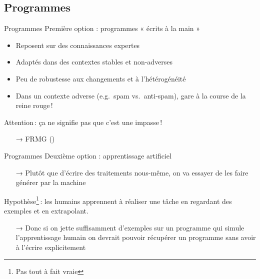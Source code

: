 \documentclass[xcolor={svgnames}, french]{beamer}
\begin{document}
\subsection{Programmes}
\begin{frame}{Programmes}
	Première option : programmes « écrits à la main »
	\begin{itemize}
		\item Reposent sur des \alert{connaissances expertes}
		\item Adaptés dans des contextes \alert{stables} et \alert{non-adverses}
		\item Peu de robustesse aux changements et à l'\alert{hétérogénéité}
		\item Dans un contexte adverse (e.g.\ spam vs.\ anti-spam), gare à la course de la reine rouge !
	\end{itemize}
	Attention : ça ne signifie pas que c'est une impasse !
	\begin{itemize}
		\item[→] FRMG ()
	\end{itemize}
\end{frame}

\begin{frame}{Programmes}
	Deuxième option : \alert{apprentissage artificiel}

	\begin{itemize}
		\item[→] Plutôt que d'écrire des traitements nous-même, on va essayer de les faire générer par la machine
	\end{itemize}

	Hypothèse\footnote{Pas tout à fait vraie} : les humains apprennent à réaliser une tâche en  regardant des \alert{exemples} et en \alert{extrapolant}.

	\begin{itemize}
		\item[→] Donc si on jette suffisamment d'exemples sur un programme qui simule l'apprentissage humain on devrait pouvoir récupérer un programme sans avoir à l'écrire explicitement
	\end{itemize}
\end{frame}
\end{document}
